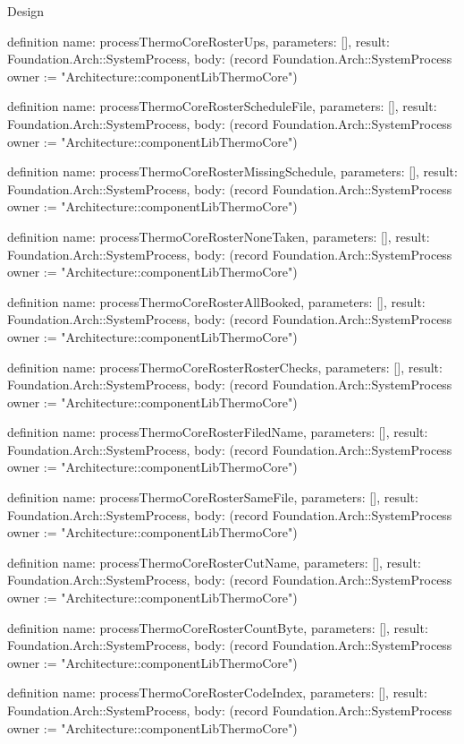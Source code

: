 \begin{lexlean}{Design}
\begin{semanticmodule}
definition{
  name: processThermoCoreRosterUps,
  parameters: [],
  result: Foundation.Arch::SystemProcess,
  body: (record Foundation.Arch::SystemProcess {owner := "Architecture::componentLibThermoCore"})
}

definition{
  name: processThermoCoreRosterScheduleFile,
  parameters: [],
  result: Foundation.Arch::SystemProcess,
  body: (record Foundation.Arch::SystemProcess {owner := "Architecture::componentLibThermoCore"})
}

definition{
  name: processThermoCoreRosterMissingSchedule,
  parameters: [],
  result: Foundation.Arch::SystemProcess,
  body: (record Foundation.Arch::SystemProcess {owner := "Architecture::componentLibThermoCore"})
}

definition{
  name: processThermoCoreRosterNoneTaken,
  parameters: [],
  result: Foundation.Arch::SystemProcess,
  body: (record Foundation.Arch::SystemProcess {owner := "Architecture::componentLibThermoCore"})
}

definition{
  name: processThermoCoreRosterAllBooked,
  parameters: [],
  result: Foundation.Arch::SystemProcess,
  body: (record Foundation.Arch::SystemProcess {owner := "Architecture::componentLibThermoCore"})
}

definition{
  name: processThermoCoreRosterRosterChecks,
  parameters: [],
  result: Foundation.Arch::SystemProcess,
  body: (record Foundation.Arch::SystemProcess {owner := "Architecture::componentLibThermoCore"})
}

definition{
  name: processThermoCoreRosterFiledName,
  parameters: [],
  result: Foundation.Arch::SystemProcess,
  body: (record Foundation.Arch::SystemProcess {owner := "Architecture::componentLibThermoCore"})
}

definition{
  name: processThermoCoreRosterSameFile,
  parameters: [],
  result: Foundation.Arch::SystemProcess,
  body: (record Foundation.Arch::SystemProcess {owner := "Architecture::componentLibThermoCore"})
}

definition{
  name: processThermoCoreRosterCutName,
  parameters: [],
  result: Foundation.Arch::SystemProcess,
  body: (record Foundation.Arch::SystemProcess {owner := "Architecture::componentLibThermoCore"})
}

definition{
  name: processThermoCoreRosterCountByte,
  parameters: [],
  result: Foundation.Arch::SystemProcess,
  body: (record Foundation.Arch::SystemProcess {owner := "Architecture::componentLibThermoCore"})
}

definition{
  name: processThermoCoreRosterCodeIndex,
  parameters: [],
  result: Foundation.Arch::SystemProcess,
  body: (record Foundation.Arch::SystemProcess {owner := "Architecture::componentLibThermoCore"})
}


\end{semanticmodule}
\end{lexlean}
